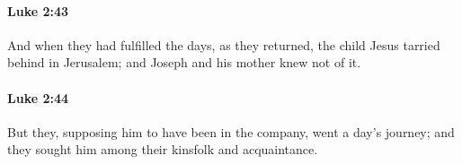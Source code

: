 		\paragraph{Luke 2:43} %
			\label{LUKE-2-43}

			And when they had fulfilled the days, as they returned, the child Jesus tarried behind in Jerusalem; and Joseph and his mother knew not of it.

			\begin{framed}
			\scriptsize
				\begin{compactdesc}
					\item[SBLG] 
				\end{compactdesc}
			\end{framed}

		\paragraph{Luke 2:44} %
			\label{LUKE-2-44}

			But they, supposing him to have been in the company, went a day's journey; and they sought him among their kinsfolk and acquaintance.

